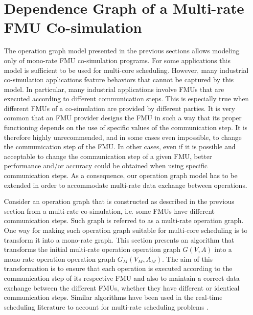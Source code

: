 \section{\label{sec:opgraph}Dependence Graph of a Multi-rate FMU Co-simulation}

The operation graph model presented in the previous sections allows modeling only of mono-rate FMU co-simulation programs. For some applications this model is sufficient to be used for multi-core scheduling. However, many industrial co-simulation applications feature behaviors that cannot be captured by this model. In particular, many industrial applications involve FMUs that are executed according to different communication steps. This is especially true when different FMUs of a co-simulation are provided by different parties. It is very common that an FMU provider designs the FMU in such a way that its proper functioning depends on the use of specific values of the communication step. It is therefore highly unrecommended, and in some cases even impossible, to change the communication step of the FMU. In other cases, even if it is possible and acceptable to change the communication step of a given FMU, better performance and/or accuracy could be obtained when using specific communication steps. As a consequence, our operation graph model has to be extended in order to accommodate multi-rate data exchange between operations. 

Consider an operation graph that is constructed as described in the previous section from a multi-rate co-simulation, i.e. some FMUs have different communication steps. Such graph is referred to as a multi-rate operation graph. One way for making such operation graph suitable for multi-core scheduling is to transform it into a mono-rate graph. This section presents an algorithm that transforms the initial multi-rate operation operation graph $G(V,A)$ into a mono-rate operation operation graph $G_M(V_M,A_M)$. The aim of this transformation is to ensure that each operation is executed according to the communication step of its respective FMU and also to maintain a correct data exchange between the different FMUs, whether they have different or identical communication steps. Similar algorithms have been used in the real-time scheduling literature to account for multi-rate scheduling problems \cite{kermia:2009, ramamritham:1995}.

